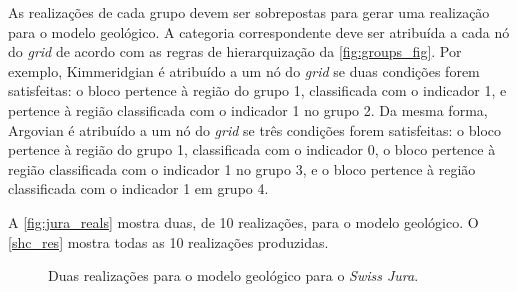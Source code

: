 \begin{figure}[H]
\end{figure}

As realizações de cada grupo devem ser sobrepostas para gerar uma realização para o modelo geológico. A categoria correspondente deve ser atribuída a cada nó do \textit{grid} de acordo com as regras de hierarquização da \autoref{fig:groups_fig}. Por exemplo, Kimmeridgian é atribuído a um nó do \textit{grid} se duas condições forem satisfeitas: o bloco pertence à região do grupo 1, classificada com o indicador 1, e pertence à região classificada com o indicador 1 no grupo 2. Da mesma forma, Argovian é atribuído a um nó do \textit{grid} se três condições forem satisfeitas: o bloco pertence à região do grupo 1, classificada com o indicador 0, o bloco pertence à região classificada com o indicador 1 no grupo 3, e o bloco pertence à região classificada com o indicador 1 em grupo 4.

A \autoref{fig:jura_reals} mostra duas, de 10 realizações, para o modelo geológico. O \autoref{shc_res} mostra todas as 10 realizações produzidas.

\begin{figure}[H]
    \centering
    \caption{Duas realizações para o modelo geológico para o \textit{Swiss Jura}.} \label{fig:jura_reals}
     \hspace{1em}
\end{figure}

